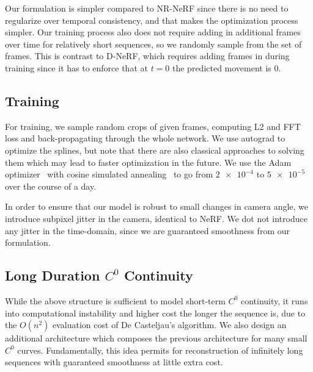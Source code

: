 Our formulation is simpler compared to NR-NeRF since there is no need to regularize over
temporal consistency, and that makes the optimization process simpler. Our training process also does not require adding in additional frames over time for relatively short sequences, so we randomly sample from the set of frames. This is contrast to D-NeRF, which requires adding frames in during training since it has to enforce that at $t=0$ the predicted movement is 0.

\subsection*{Training}

For training, we sample random crops of given frames, computing L2 and FFT loss and back-propagating through the whole network. We use autograd to optimize the splines, but note that there are also classical approaches to solving them which may lead to faster optimization in the future. We use the Adam optimizer~\cite{Kingma2015AdamAM} with cosine simulated annealing~\cite{loshchilov2017sgdr} to go from $\num{2e-4}$ to $\num{5e-5}$ over the course of a day.

In order to ensure that our model is robust to small changes in camera angle, we introduce subpixel jitter in the camera, identical to NeRF. We dot not introduce any jitter in the time-domain, since we are guaranteed smoothness from our formulation.

\subsection*{Long Duration $C^0$ Continuity}

While the above structure is sufficient to model short-term $C^0$ continuity, it runs into
computational instability and higher cost the longer the sequence is, due to the $O(n^2)$
evaluation cost of De Casteljau's algorithm. We also design an additional architecture which
composes the previous architecture for many small $C^0$ curves. Fundamentally, this idea permits
for reconstruction of infinitely long sequences with guaranteed smoothness at little extra cost.

